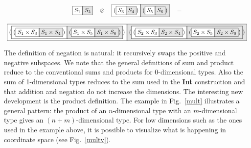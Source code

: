 \documentclass[authoryear,preprint]{sigplanconf}
\newcommand{\nodet}[2]{\fcolorbox{black}{white}{$#1$}\fcolorbox{black}{gray!20}{$#2$}}
\begin{document}
\begin{figure*}
\[\begin{array}{c}
\nodet{S_1}{S_2}
\quad\otimes\quad
\nodet{(\nodet{S_3}{S_4})}{(\nodet{S_5}{S_6})} \quad= \\
\\
\nodet{(\nodet{{(\nodet{S_1 \times S_3}{S_1 \times S_4})}}
              {{(\nodet{S_1 \times S_5}{S_1 \times S_6})}})}
      {(\nodet{{(\nodet{S_2 \times S_3}{S_2 \times S_4})}}
              {{(\nodet{S_2 \times S_5}{S_2 \times S_6})}})}
\end{array}\]
\caption{\label{mult}Example of multiplication of two cubical sets.}
\end{figure*}

\noindent The definition of negation is natural: it recursively swaps the
positive and negative subspaces. We note that the general definitions of sum
and product reduce to the conventional sums and products for 0-dimensional
types. Also the sum of 1-dimensional types reduces to the sum used in the
\textbf{Int} construction and that addition and negation do not increase the
dimensions. The interesting new development is the product definition. The
example in Fig.~\ref{mult} illustrates a general pattern: the product of an
$n$-dimensional type with an $m$-dimensional type gives an
$(n+m)$-dimensional type. For low dimensions such as the ones used in the
example above, it is possible to visualize what is happening in coordinate
space (see Fig.~\ref{multv}).
\end{document}
